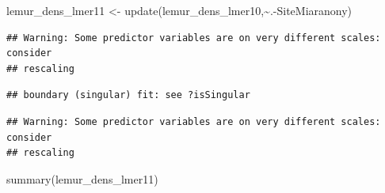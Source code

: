 \documentclass[
  12pt,
]{article}
\newenvironment{Shaded}{\begin{snugshade}}{\end{snugshade}}
\newcommand{\FunctionTok}[1]{\textcolor[rgb]{0.00,0.00,0.00}{#1}}
\newcommand{\NormalTok}[1]{#1}
\newcommand{\OtherTok}[1]{\textcolor[rgb]{0.56,0.35,0.01}{#1}}
\newcommand{\SpecialCharTok}[1]{\textcolor[rgb]{0.00,0.00,0.00}{#1}}
\begin{document}
\begin{Shaded}
\begin{Highlighting}[]
\NormalTok{lemur\_dens\_lmer11 }\OtherTok{\textless{}{-}} \FunctionTok{update}\NormalTok{(lemur\_dens\_lmer10,}\SpecialCharTok{\textasciitilde{}}\NormalTok{.}\SpecialCharTok{{-}}\NormalTok{SiteMiaranony)}
\end{Highlighting}
\end{Shaded}

\begin{verbatim}
## Warning: Some predictor variables are on very different scales: consider
## rescaling
\end{verbatim}

\begin{verbatim}
## boundary (singular) fit: see ?isSingular
\end{verbatim}

\begin{verbatim}
## Warning: Some predictor variables are on very different scales: consider
## rescaling
\end{verbatim}

\begin{Shaded}
\begin{Highlighting}[]
\FunctionTok{summary}\NormalTok{(lemur\_dens\_lmer11)}
\end{Highlighting}
\end{Shaded}
\end{document}
